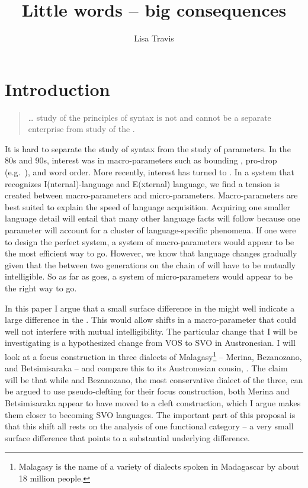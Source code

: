 \documentclass[output=paper]{langsci/langscibook}
\author{Lisa Travis\affiliation{McGill University}}
\title{Little words -- big consequences}
\begin{document}
\glsresetall

\section{Introduction}

\begin{quotation}
    \dots{} study of the principles of syntax is not and cannot be a separate
    enterprise from study of the . \parencite[9]{Kayne:2005k}
\end{quotation}

\noindent It is hard to separate the study of syntax from the study of
parameters.  In the 80s and 90s, interest was in macro-parameters such as
bounding \parencite{Rizzi:1982}, pro-drop (e.g.\ \citealt{Chomsky:1981}), and
word order.  More recently, interest has turned to \textcite{Kayne:2005k}. In a
system that recognizes I(nternal)-language and E(xternal) language, we find a
tension is created between macro-parameters and micro-parameters.
Macro-parameters are best suited to explain the speed of language acquisition.
Acquiring one smaller language detail will entail that many other language
facts will follow because one parameter will account for a cluster of
language-specific phenomena.  If one were to design the perfect
 system, a system of macro-parameters would
appear to be the most efficient way to go. However, we know that language
changes gradually given that the  between two generations on
the chain of  will have to be mutually intelligible.  So
as far as  goes, a system of micro-pa\-ram\-e\-ters would appear to
be the right way to go.

In this paper I argue that a small surface difference in the 
might well indicate a large difference in the .  This would allow
shifts in a macro-parameter that could well not interfere with mutual
intelligibility.  The particular change that I will be investigating is a
hypothesized change from VOS to SVO in Austronesian.  I will look at a focus
construction in three dialects of Malagasy\footnote{Malagasy is the
    name of a variety of dialects spoken in Madagascar by about 18 million
people.} -- Merina, Bezanozano, and Betsimisaraka -- and compare this to its
Austronesian cousin, .  The claim will be that while 
and Bezanozano, the most conservative  dialect of the three, can
be argued to use pseudo-clefting for their
focus construction, both Merina and Betsimisaraka appear to have
moved to a cleft construction, which I argue makes them closer to
becoming SVO languages.  The important part of this proposal is that this shift
all rests on the analysis of one functional category -- a very small surface
difference that points to a substantial underlying difference.
\end{document}
